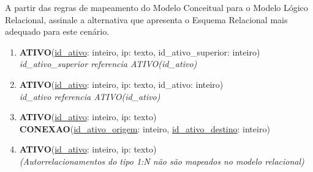 \documentclass[12pt,a4paper]{article}
\begin{document}
\begin{enumerate}
\begin{center}
\end{center}



A partir das regras de mapeamento do Modelo Conceitual para o Modelo Lógico Relacional, assinale a alternativa que apresenta o Esquema Relacional mais adequado para este cenário.

\begin{enumerate}[label=\Alph*)]
    
    \item \textbf{ATIVO}(\underline{id\_ativo}: inteiro, ip: texto, id\_ativo\_superior: inteiro) \\
    \textit{id\_ativo\_superior referencia ATIVO(id\_ativo)}
    
    \item \textbf{ATIVO}(\underline{id\_ativo}: inteiro, ip: texto, id\_ativo: inteiro) \\
    \textit{id\_ativo referencia ATIVO(id\_ativo)}
    
    \item \textbf{ATIVO}(\underline{id\_ativo}: inteiro, ip: texto) \\
    \textbf{CONEXAO}(\underline{id\_ativo\_origem}: inteiro, \underline{id\_ativo\_destino}: inteiro)
    \item \textbf{ATIVO}(\underline{id\_ativo}: inteiro, ip: texto) \\
    \textit{(Autorrelacionamentos do tipo 1:N não são mapeados no modelo relacional)}


\end{enumerate}
\end{enumerate}
\end{document}
